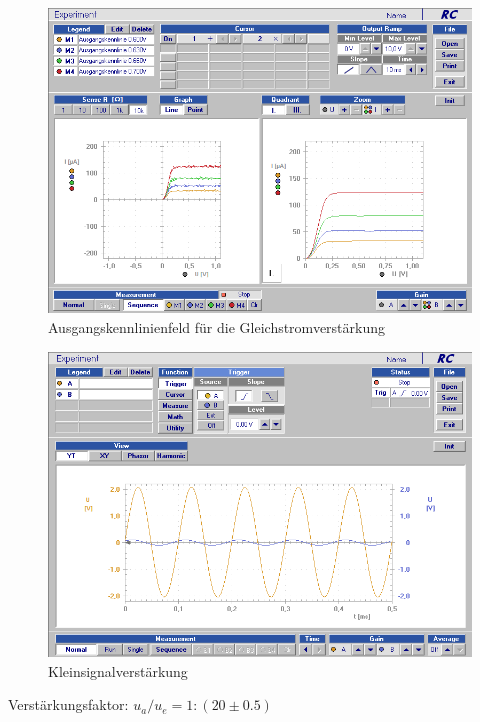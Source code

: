 \documentclass[12pt,a4paper]{article}
\begin{document}
\begin{figure}[H]
	\centering
	\includegraphics[scale=0.45]{./data/Braun_Kurz_PS8/Ausgangskennlinienfeld.png}
	\caption{Ausgangskennlinienfeld für die Gleichstromverstärkung}
	\label{fig:ausgangskennlinienfeld}
\end{figure}

\begin{figure}[H]
	\centering
	\includegraphics[scale=0.45]{./data/Braun_Kurz_PS8/Kleinsignalverstaerkung.png}
	\caption{Kleinsignalverstärkung}
	\label{fig:kleinsignalverstaerkung}
\end{figure}

Verstärkungsfaktor: $u_a/u_e= 1: (20 \pm 0.5)$

\end{document}
